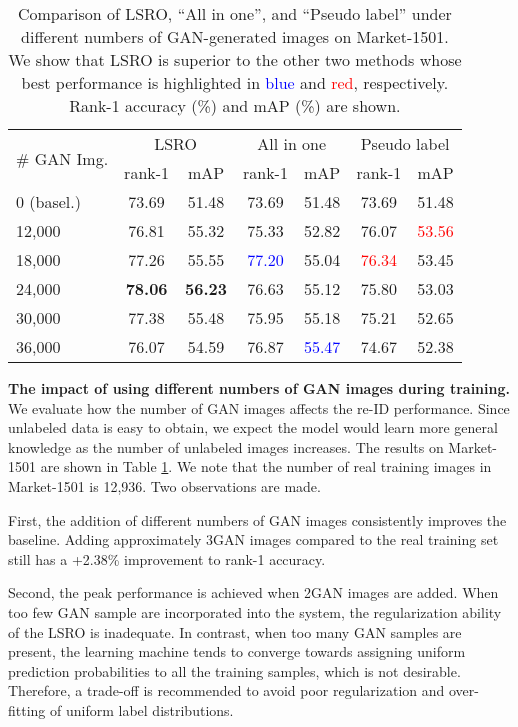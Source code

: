 \documentclass[10pt,twocolumn,letterpaper]{article}
\begin{document}
\setlength{\tabcolsep}{4pt}
\begin{table}
\small
\begin{center}
\begin{tabular}{l|cc|cc|cc}
\hline
\multirow{2}{*}{\# GAN Img.} & \multicolumn{2}{c|}{LSRO} & \multicolumn{2}{c|}{All in one} & \multicolumn{2}{c}{Pseudo label}\\
& rank-1 & mAP & rank-1  & mAP& rank-1  & mAP \\
\hline
0 (basel.) & 73.69 & 51.48  & 73.69 & 51.48  & 73.69 & 51.48\\ 
12,000 & 76.81 & 55.32 & 75.33 & 52.82 & 76.07 & \textcolor{red}{53.56} \\    
18,000 & 77.26 & 55.55 & \textcolor{blue}{77.20} & 55.04 & \textcolor{red}{76.34} & 53.45\\
24,000 & \textbf{78.06} & \textbf{56.23} & 76.63 & 55.12 & 75.80 & 53.03\\
30,000 & 77.38 & 55.48& 75.95 &55.18& 75.21 & 52.65 \\ 
36,000 & 76.07 & 54.59& 76.87 &\textcolor{blue}{55.47} & 74.67 & 52.38\\
\hline
\end{tabular}
\end{center}
\caption{Comparison of LSRO, ``All in one'', and ``Pseudo label'' under different numbers of GAN-generated images on Market-1501. We show that LSRO is superior to the other two methods whose best performance is highlighted in \textcolor{blue}{blue} and \textcolor{red}{red}, respectively. Rank-1 accuracy (\%) and mAP (\%) are shown.}
\label{table:bigdata}
\end{table}

\textbf{The impact of using different numbers of GAN images during training.} 
We evaluate how the number of GAN images affects the re-ID performance. Since unlabeled data is easy to obtain, we expect the model would learn more general knowledge as the number of unlabeled images increases. The results on Market-1501 are shown in Table \ref{table:bigdata}. We note that the number of real training images in Market-1501 is 12,936. Two observations are made. 

First, the addition of different numbers of GAN images consistently improves the baseline. Adding approximately 3GAN images compared to the real training set still has a +2.38\% improvement to rank-1 accuracy. 

Second, the peak performance is achieved when 2GAN images are added. When too few GAN sample are incorporated into the system, the regularization ability of the LSRO is inadequate. In contrast, when too many GAN samples are present, the learning machine tends to converge towards assigning uniform prediction probabilities to all the training samples, which is not desirable. Therefore, a trade-off is recommended to avoid poor regularization and over-fitting of uniform label distributions.
\end{document}
